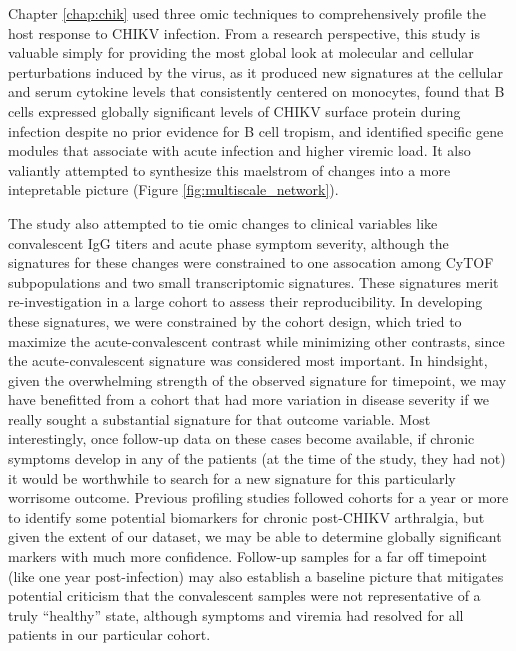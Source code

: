 Chapter \ref{chap:chik} used three omic techniques to comprehensively profile the host response to CHIKV infection. From a research perspective, this study is valuable simply for providing the most global look at molecular and cellular perturbations induced by the virus, as it produced new signatures at the cellular and serum cytokine levels that consistently centered on monocytes, found that B cells expressed globally significant levels of CHIKV surface protein during infection despite no prior evidence for B cell tropism, and identified specific gene modules that associate with acute infection and higher viremic load. It also valiantly attempted to synthesize this maelstrom of changes into a more intepretable picture (Figure \ref{fig:multiscale_network}).

The study also attempted to tie omic changes to clinical variables like convalescent IgG titers and acute phase symptom severity, although the signatures for these changes were constrained to one assocation among CyTOF subpopulations and two small transcriptomic signatures. These signatures merit re-investigation in a large cohort to assess their reproducibility. In developing these signatures, we were constrained by the cohort design, which tried to maximize the acute-convalescent contrast while minimizing other contrasts, since the acute-convalescent signature was considered most important. In hindsight, given the overwhelming strength of the observed signature for timepoint, we may have benefitted from a cohort that had more variation in disease severity if we really sought a substantial signature for that outcome variable. Most interestingly, once follow-up data on these cases become available, if chronic symptoms develop in any of the patients (at the time of the study, they had not) it would be worthwhile to search for a new signature for this particularly worrisome outcome. Previous profiling studies followed cohorts for a year or more to identify some potential biomarkers for chronic post-CHIKV arthralgia,\autocite{Poo2014,Chaaitanya2011,Hoarau2010,Schilte2013} but given the extent of our dataset, we may be able to determine globally significant markers with much more confidence. Follow-up samples for a far off timepoint (like one year post-infection) may also establish a baseline picture that mitigates potential criticism that the convalescent samples were not representative of a truly ``healthy'' state, although symptoms and viremia had resolved for all patients in our particular cohort.

